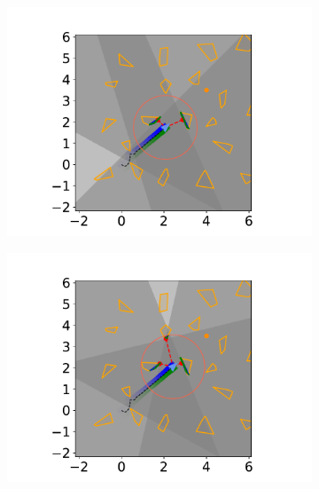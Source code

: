 \begin{figure}[H]
    \begin{subfigure}{0.20\textwidth}
        \centering
        \includegraphics[width=\textwidth]{../figures/Simulations/sim2unkenv/frame_5.pdf}
    \end{subfigure}%
    \hfill
    \begin{subfigure}{0.20\textwidth}
        \centering
        \includegraphics[width=\textwidth]{../figures/Simulations/sim2unkenv/frame_6.pdf}
    \end{subfigure}%
    \hfill
    \begin{subfigure}{0.20\textwidth}
        \centering

\end{subfigure}
\end{figure}
